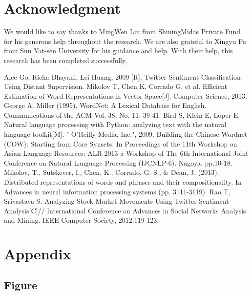 \documentclass[10pt, conference, compsocconf]{IEEEtran}
\begin{document}
\section*{Acknowledgment}

We would like to say thanks to MingWen Liu from ShiningMidas Private Fund for his generous help throughout the research. We are also grateful to Xingyu Fu from Sun Yat-sen University for his guidance and help. With their help, this research has been completed successfully.

\vspace{0.5cm}
\begin{thebibliography}{1}
Alec Go, Richa Bhayani, Lei Huang, 2009 [R]. Twitter Sentiment Classification Using Distant Supervision.\label{ref 1}
Mikolov T, Chen K, Corrado G, et al. Efficient Estimation of Word Representations in Vector Space[J]. Computer Science, 2013. \label{ref 2}
George A. Miller (1995). WordNet: A Lexical Database for English. Communications of the ACM Vol. 38, No. 11: 39-41.\label{ref 3}
Bird S, Klein E, Loper E. Natural language processing with Python: analyzing text with the natural language toolkit[M]. " O'Reilly Media, Inc.", 2009. \label{ref 4}
Building the Chinese Wordnet (COW): Starting from Core Synsets. In Proceedings of the 11th Workshop on Asian Language Resources: ALR-2013 a Workshop of The 6th International Joint Conference on Natural Language Processing (IJCNLP-6). Nagoya. pp.10-18. \label{ref 5}
Mikolov, T., Sutskever, I., Chen, K., Corrado, G. S., \& Dean, J. (2013). Distributed representations of words and phrases and their compositionality. In Advances in neural information processing systems (pp. 3111-3119). \label{ref 6}
Rao T, Srivastava S. Analyzing Stock Market Movements Using Twitter Sentiment Analysis[C]// International Conference on Advances in Social Networks Analysis and Mining. IEEE Computer Society, 2012:119-123. \label{ref 7}
\end{thebibliography}
\section{Appendix}
\subsection{Figure}
\end{document}
